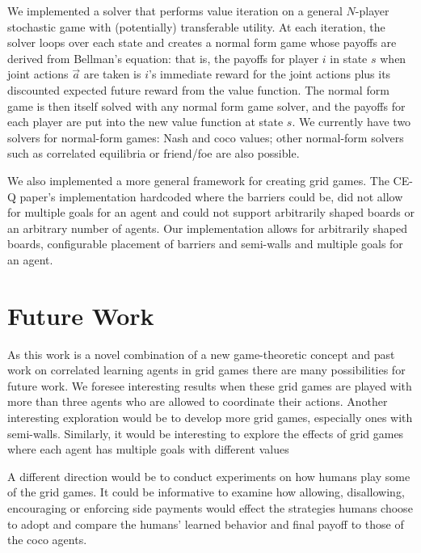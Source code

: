 We implemented a solver that performs value iteration on a general $N$-player stochastic game with (potentially) transferable utility. At each iteration, the solver loops over each state and creates a normal form game whose payoffs  are derived from Bellman's equation: that is, the payoffs for player $i$ in state $s$ when joint actions $\vec{a}$ are taken is $i$'s immediate reward for the joint actions plus its discounted expected future reward from the value function. The normal form game is then itself solved with any normal form game solver, and the payoffs for each player are put into the new value function at state $s$. We currently have two solvers for normal-form games: Nash and coco values; other normal-form solvers such as correlated equilibria or friend/foe are also possible.

We also implemented a more general framework for creating grid games. The CE-Q paper's implementation hardcoded where the barriers could be, did not allow for multiple goals for an agent and could not support arbitrarily shaped boards or an arbitrary number of agents. Our implementation allows for arbitrarily shaped boards, configurable placement of barriers and semi-walls and multiple goals for an agent.

\section{Future Work}
\hspace{5mm}As this work is a novel combination of a new game-theoretic concept and past work on correlated learning agents in grid games there are many possibilities for future work. We foresee interesting results when these grid games are played with more than three agents who are allowed to coordinate their actions. Another interesting exploration would be to develop more grid games, especially ones with semi-walls. Similarly, it would be interesting to explore the effects of grid games where each agent has multiple goals with different values

A different direction would be to conduct experiments on how humans play some of the grid games. It could be informative to examine how allowing, disallowing, encouraging or enforcing side payments would effect the strategies humans choose to adopt and compare the humans' learned behavior and final payoff to those of the coco agents.


